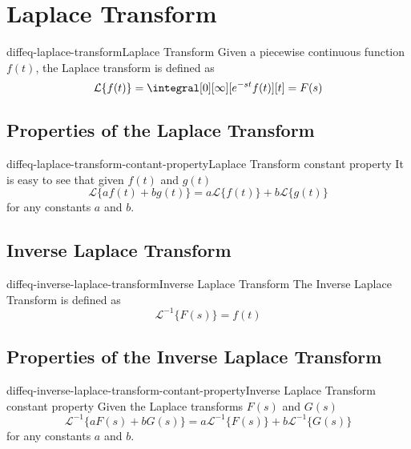 \documentclass[preview]{standalone}
\begin{document}
\genpage

\section{Laplace Transform}

\begin{snippetdefinition}{diffeq-laplace-transform}{Laplace Transform}
    Given a piecewise continuous function \(f(t)\), the Laplace transform
    is defined as
    \[
        \mathcal{L}\{f(t)\}= \integral[0][\infty][e^{-st}f(t)][t]=F(s)
    \]
\end{snippetdefinition}

\subsection{Properties of the Laplace Transform}

\begin{snippetcorollary}{diffeq-laplace-transform-contant-property}{Laplace Transform constant property}
    It is easy to see that given \(f(t)\) and \(g(t)\)
    \[
        \mathcal{L}\{af(t)+bg(t)\} = a\mathcal{L}\{f(t)\} + b\mathcal{L}\{g(t)\}
    \]
    for any constants \(a\) and \(b\).
\end{snippetcorollary}

\subsection{Inverse Laplace Transform}

\begin{snippetdefinition}{diffeq-inverse-laplace-transform}{Inverse Laplace Transform}
    The Inverse Laplace Transform is defined as
    \[
        {\mathcal{L}}^{-1} \{F(s)\}= f(t)
    \]
\end{snippetdefinition}

\subsection{Properties of the Inverse Laplace Transform}

\begin{snippetcorollary}{diffeq-inverse-laplace-transform-contant-property}{Inverse Laplace Transform constant property}
    Given the Laplace transforms \(F(s)\) and \(G(s)\)
    \[
        {\mathcal{L}}^{-1} \{aF(s)+bG(s)\} =
        a{\mathcal{L}}^{-1}\{F(s)\} +
        b{\mathcal{L}}^{-1}\{G(s)\}
    \]
    for any constants \(a\) and \(b\).
\end{snippetcorollary}
\end{document}
